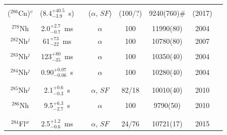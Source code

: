 \begin{center}
\begin{longtable}{c|ccccccl}
			&				&			&					&			& 				    &		&{\tiny\cite{Oganessian2017,Cox2023}}\\
($^{286}$Cn)$^v$& (8.4$^{+40.5}_{-3.9}$~s)&&($\alpha$, $SF$)&(100/?)	&9240(760)$\#$	    &(2017)	&{\tiny\cite{Kaji2017}}\\
\hline\\
$^{278}$Nh	& 2.0$^{+2.7}_{-0.7}$~ms& 	&$\alpha$			&100		&11990(80)		    &2004	&{\tiny\cite{Morita2004b,Morita2007a,Morita2008,Morita2009a,Morita2012,Morita2015}}\\
$^{282}$Nh$^j$& 61$^{+73}_{-22}$~ms& 	&$\alpha$			&100		&10780(80)		    &2007	&{\tiny\cite{Oganessian2007b,Oganessian2009a,Oganessian2011a,Oganessian2013,Oganessian2015,Oganessian2017}}\\
			&				&			&					&			& 				    &		&{\tiny\cite{Oganessian2022d}}\\
$^{283}$Nh$^j$& 123$^{+80}_{-35}$~ms& 	&$\alpha$			&100		&10350(40)	       &2004	&{\tiny\cite{Oganessian2003,Oganessian2004b,Rudolph2013,Oganessian2015,Forsberg2016,Oganessian2017}}\\
			&				&			&					&			& 				    &		&{\tiny\cite{Oganessian2022d}}\\
$^{284}$Nh$^j$& 0.90$^{+0.07}_{-0.06}$~s& &$\alpha$			&100	    &10280(40)		    &2004	&{\tiny\cite{Oganessian2004b,Dmitriev2005,Oganessian2005,Oganessian2011,Oganessian2012,Oganessian2013}}\\
			&				&			&					&			& 				    &		&{\tiny\cite{Rudolph2013,Dmitriev2014,Gates2015,Oganessian2015,Rudolph2015,Forsberg2016}}\\
			&				&			&					&			& 				    &		&{\tiny\cite{Aksenov2017,Oganessian2017,Gates2018,Oganessian2022d}}\\
$^{285}$Nh$^j$& 2.1$^{+0.6}_{-0.3}$~s& 	&$\alpha$, $SF$		&82/18		&10010(40)		    &2010	&{\tiny\cite{Oganessian2010,Oganessian2011,Oganessian2011a,Oganessian2012a,Oganessian2015,Oganessian2017}}\\
			&				&			&					&			& 				    &		&{\tiny\cite{Khuyagbaatar2019,Oganessian2022d}}\\
$^{286}$Nh	& 9.5$^{+6.3}_{-2.7}$~s& 	&$\alpha$	        &100        &9790(50)		    &2010	&{\tiny\cite{Oganessian2010,Oganessian2011,Oganessian2011a,Oganessian2012a,Oganessian2013b,Khuyagbaatar2014}}\\
			&				&			&					&			& 				    &		&{\tiny\cite{Oganessian2015,Oganessian2017,Khuyagbaatar2019}}\\
\hline\\
$^{284}$Fl$^w$& 2.5$^{+1.2}_{-0.6}$~ms& &$\alpha$, $SF$		&24/76		&10721(17)          &2015	&{\tiny\cite{Utyonkov2015,Oganessian2017,Utyonkov2018,Oganessian2025}}\\

\end{longtable}
\end{center}
